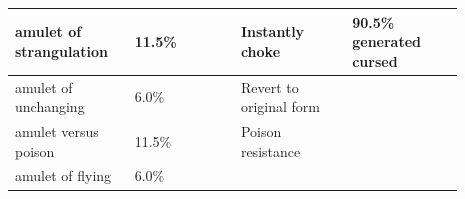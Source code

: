 {\begin{longtable}{|>{\RaggedRight}p{0.22474\linewidth}|>{\RaggedRight}p{0.21149\linewidth}|>{\RaggedRight}p{0.22474\linewidth}|>{\RaggedRight}p{0.22474\linewidth}|}
\hspace*{0pt}\ignorespaces{}\hspace*{0pt}amulet of strangulation\footnotemark[46]&\hspace*{0pt}\ignorespaces{}\hspace*{0pt}11.5\%&\hspace*{0pt}\ignorespaces{}\hspace*{0pt}Instantly choke\footnotemark[47]&\hspace*{0pt}\ignorespaces{}\hspace*{0pt}90.5\% generated cursed\\ \hline \hspace*{0pt}\ignorespaces{}\hspace*{0pt}amulet of unchanging\footnotemark[48]&\hspace*{0pt}\ignorespaces{}\hspace*{0pt}6.0\%&\hspace*{0pt}\ignorespaces{}\hspace*{0pt}Revert to original form&\hspace*{0pt}\ignorespaces{}\hspace*{0pt}\\ \hline \hspace*{0pt}\ignorespaces{}\hspace*{0pt}amulet versus poison\footnotemark[49]&\hspace*{0pt}\ignorespaces{}\hspace*{0pt}11.5\%&\hspace*{0pt}\ignorespaces{}\hspace*{0pt}Poison resistance\footnotemark[50]&\hspace*{0pt}\ignorespaces{}\hspace*{0pt}\\ \hline \hspace*{0pt}\ignorespaces{}\hspace*{0pt}amulet of flying\footnotemark[51]&\hspace*{0pt}\ignorespaces{}\hspace*{0pt}6.0\%&\hspace*{0pt}\ignorespaces{}\hspace*{0pt}{\itshape \allowbreak{}\setmainfont{cmunti.ttf}[RawFeature={fallback=myfallback},Path=/usr/share/fonts/truetype/cmu/,UprightFont=cmunrm,BoldFont=cmunbx,ItalicFont=cmunti,BoldItalicFont=cmunbi]\setmonofont{cmunti.ttf}[RawFeature={fallback=myfallback},Path=/usr/share/fonts/truetype/cmu/,UprightFont=cmuntt,BoldFont=cmuntb,ItalicFont=cmunit,BoldItalicFont=cmuntx]\itshape (no 
\end{longtable}}
